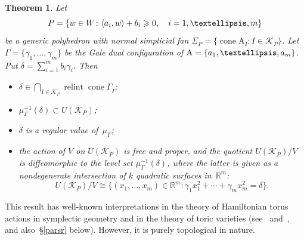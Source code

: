 \documentclass[a4paper]{amsart}
\newtheorem{theorem}{Theorem}[section]
\theoremstyle{definition}
\theoremstyle{remark}
\numberwithin{equation}{section}
\def\R{\mathbb R}
\def\R{\mathbb R}
\def\sK{\mathcal K}
\newcommand{\mb}[1]{{\textbf {\textit#1}}}
\renewcommand{\ge}{\geqslant}
\def\cone{\mathop{\mathrm{cone}}}
\def\relint{\mathop{\mathrm{relint}}}
\newcommand{\<}{\langle}
\renewcommand{\>}{\rangle}
\begin{document}
\begin{theorem}\label{quadrics}
Let 
\[
  P=\{\mb w\in W\colon\langle \mb a_i,\mb w\rangle+b_i\ge0,\quad i=1,\ldots,m\}
\]  
be a generic polyhedron with normal simplicial fan $\Sigma_P=\{\cone \mathrm A_I\colon I\in\mathcal K_P\}$. Let $\Gamma=\{\gamma_1,\ldots,\gamma_m\}$ be the Gale dual configuration of $\mathrm A=\{\mb a_1,\ldots,\mb a_m\}$. Put $\delta=\sum_{i=1}^mb_i\gamma_i$. Then 
\begin{itemize}
\item[(1)] $\delta\in\bigcap_{I\in\mathcal K_P}\relint\cone\Gamma_{\widehat I}$;

\item[(2)] $\mu_\Gamma^{-1}(\delta)\subset U(\sK_P)$;

\smallskip

\item[(3)] $\delta$ is a regular value of~$\mu_\Gamma$;

\smallskip

\item[(4)] the action of $V$ on $U(\sK_P)$ is free and proper, and the quotient $U(\sK_P)/V$ is diffeomorphic to the level set $\mu_\Gamma^{-1}(\delta)$, where the latter is given as a nondegenerate intersection of $k$ quadratic surfaces in~$\R^m$:
\[
  U(\sK_P)/V\cong\{(x_1,\ldots,x_m)\in\R^m\colon\gamma_1 x^2_1+ 
  \cdots+\gamma_mx^2_m=\delta\}.
\]
\end{itemize}
\end{theorem}

This result has well-known interpretations in the theory of Hamiltonian torus actions in symplectic geometry and in the theory of toric varieties (see~\cite[Proposition~3.1.1]{audi91} and~\cite[Appendix~1, Theorems~1.2 and~1.4]{guil94}, and also~\S\ref{parsr} below). However, it is purely topological in nature.
\end{document}
